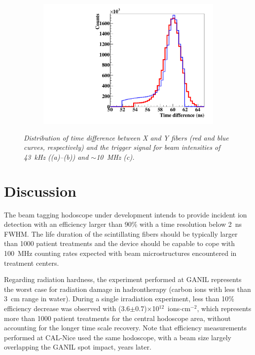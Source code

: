 \documentclass[a4paper,11pt]{article}
\begin{document}
\begin{figure}[htb]
    \begin{subfigure}{0.3\textwidth} \centering \includegraphics[width=\textwidth]{figures/time_XY_10MHz_August.pdf} \caption{} \label{fig:Time_10MHz}
    \end{subfigure}
\caption{\small{\textit{Distribution of time difference between X and Y fibers (red and blue curves, respectively) and the trigger signal for beam intensities of 43~kHz ((a)--(b)) and $\sim$10~MHz (c).}}}
\label{fig:Time_coinc}
\end{figure}

\section{Discussion}

The beam tagging hodoscope under development intends to provide incident ion detection with an efficiency larger than 90\% with a time resolution below 2~ns FWHM. The life duration of the scintillating fibers should be typically larger than 1000 patient treatments and the device should be capable to cope with 100~MHz counting rates expected with beam microstructures encountered in treatment centers. 

Regarding radiation hardness, the experiment performed at GANIL represents the worst case for radiation damage in hadrontherapy (carbon ions with less than 3~cm range in water). During a single irradiation experiment, less than 10\% efficiency decrease was observed with (3.6$\pm$0.7)$\times$10$^{12}$~ions$\cdot$cm$^{-2}$, which represents more than 1000 patient treatments for the central hodoscope area, without accounting for the longer time scale recovery. Note that efficiency measurements performed at CAL-Nice used the same hodoscope, with a beam size largely overlapping the GANIL spot impact, years later.
\end{document}
